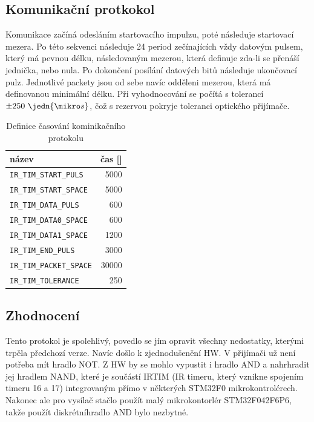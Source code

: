 \subsection{Komunikační protkokol}
Komunikace začíná odesláním startovacího impulzu, poté následuje startovací mezera. Po této sekvenci následuje 24 period zečínajících vždy datovým pulsem, který má pevnou délku, následovaným mezerou, která definuje zda-li se přenáší jednička, nebo nula. Po dokončení posílání datových bitů následuje ukončovací pulz. Jednotlivé packety jsou od sebe navíc odděleni mezerou, která má definovanou minimální délku. Při vyhodnocování se počítá s tolerancí $\pm250~\jedn{\mikro s}$, čož s rezervou pokryje toleranci optického přijímače.

\begin{table}[H]
  \caption{Definice časování kominikačního protokolu}
  \begin{center}
  	\small
	  \begin{tabular}{|l|r|}
	    \hline
	    \textbf{název} & \textbf{čas [\jedn{\mikro s}]} \\\hline\hline
	    \texttt{IR\_TIM\_START\_PULS}       &  5000     \\\hline
	    \texttt{IR\_TIM\_START\_SPACE}      &  5000     \\\hline
	    \texttt{IR\_TIM\_DATA\_PULS}        &   600     \\\hline
	    \texttt{IR\_TIM\_DATA0\_SPACE}      &   600     \\\hline
        \texttt{IR\_TIM\_DATA1\_SPACE}      &  1200     \\\hline
        \texttt{IR\_TIM\_END\_PULS}         &  3000     \\\hline
        \texttt{IR\_TIM\_PACKET\_SPACE}     & 30000     \\\hline
        \texttt{IR\_TIM\_TOLERANCE}         &   250     \\\hline
	  \end{tabular}
  \end{center}
\end{table}



\subsection{Zhodnocení}
Tento protokol je spolehlivý, povedlo se jím opravit všechny nedostatky, kterými trpěla předchozí verze. Navíc došlo k zjednodušenění HW. V přijímači už není potřeba mít hradlo NOT. Z HW by se mohlo vypustit i hradlo AND a nahrhradit jej hradlem NAND, které je součástí IRTIM (IR timeru, který vznikne spojením timeru 16 a 17) integrovaným přímo v některých STM32F0 mikrokontrolérech. Nakonec ale pro vysílač stačlo použít malý mikrokontorlér STM32F042F6P6, takže použít diskrétníhradlo AND bylo nezbytné.

